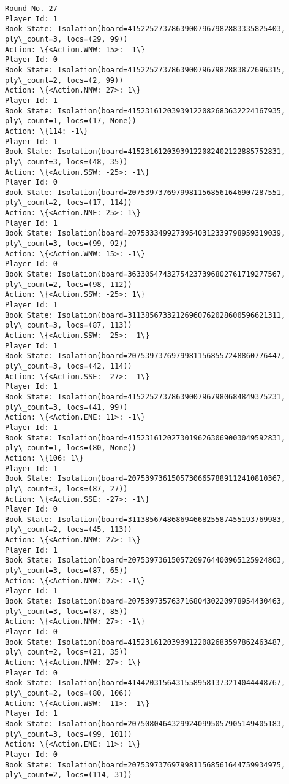 \documentclass[11pt]{article}
\begin{document}
\begin{Verbatim}[commandchars=\\\{\}]
Round No. 27
Player Id: 1
Book State: Isolation(board=41522527378639007967982883335825403, ply\_count=3, locs=(29, 99))
Action: \{<Action.WNW: 15>: -1\}
Player Id: 0
Book State: Isolation(board=41522527378639007967982883872696315, ply\_count=2, locs=(2, 99))
Action: \{<Action.NNW: 27>: 1\}
Player Id: 1
Book State: Isolation(board=41523161203939122082683632224167935, ply\_count=1, locs=(17, None))
Action: \{114: -1\}
Player Id: 1
Book State: Isolation(board=41523161203939122082402122885752831, ply\_count=3, locs=(48, 35))
Action: \{<Action.SSW: -25>: -1\}
Player Id: 0
Book State: Isolation(board=20753973769799811568561646907287551, ply\_count=2, locs=(17, 114))
Action: \{<Action.NNE: 25>: 1\}
Player Id: 1
Book State: Isolation(board=20753334992739540312339798959319039, ply\_count=3, locs=(99, 92))
Action: \{<Action.WNW: 15>: -1\}
Player Id: 0
Book State: Isolation(board=36330547432754237396802761719277567, ply\_count=2, locs=(98, 112))
Action: \{<Action.SSW: -25>: 1\}
Player Id: 1
Book State: Isolation(board=31138567332126960762028600596621311, ply\_count=3, locs=(87, 113))
Action: \{<Action.SSW: -25>: -1\}
Player Id: 1
Book State: Isolation(board=20753973769799811568557248860776447, ply\_count=3, locs=(42, 114))
Action: \{<Action.SSE: -27>: -1\}
Player Id: 1
Book State: Isolation(board=41522527378639007967980684849375231, ply\_count=3, locs=(41, 99))
Action: \{<Action.ENE: 11>: -1\}
Player Id: 1
Book State: Isolation(board=41523161202730196263069003049592831, ply\_count=1, locs=(80, None))
Action: \{106: 1\}
Player Id: 1
Book State: Isolation(board=20753973615057306657889112410810367, ply\_count=3, locs=(87, 27))
Action: \{<Action.SSE: -27>: -1\}
Player Id: 0
Book State: Isolation(board=31138567486869466825587455193769983, ply\_count=2, locs=(45, 113))
Action: \{<Action.NNW: 27>: 1\}
Player Id: 1
Book State: Isolation(board=20753973615057269764400965125924863, ply\_count=3, locs=(87, 65))
Action: \{<Action.NNW: 27>: -1\}
Player Id: 1
Book State: Isolation(board=20753973576371680430220978954430463, ply\_count=3, locs=(87, 85))
Action: \{<Action.NNW: 27>: -1\}
Player Id: 0
Book State: Isolation(board=41523161203939122082683597862463487, ply\_count=2, locs=(21, 35))
Action: \{<Action.NNW: 27>: 1\}
Player Id: 0
Book State: Isolation(board=41442031564315589581373214044448767, ply\_count=2, locs=(80, 106))
Action: \{<Action.WSW: -11>: -1\}
Player Id: 1
Book State: Isolation(board=20750804643299240995057905149405183, ply\_count=3, locs=(99, 101))
Action: \{<Action.ENE: 11>: 1\}
Player Id: 0
Book State: Isolation(board=20753973769799811568561644759934975, ply\_count=2, locs=(114, 31))

\end{Verbatim}
\end{document}
